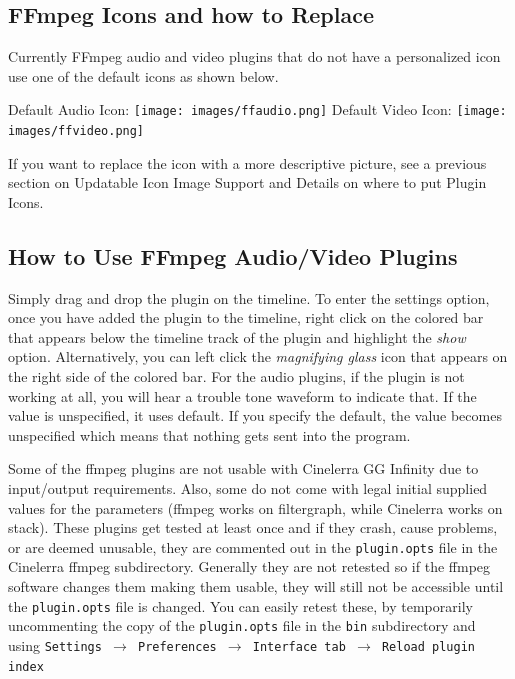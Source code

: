 \subsection{FFmpeg Icons and how to Replace}%
\label{sub:ffmpeg_icons_how_replace}

Currently FFmpeg audio and video plugins that do not have a personalized icon use one of the default icons as shown below.

Default Audio Icon: \quad \texttt{[image: images/ffaudio.png]}
\quad Default Video Icon: \quad \texttt{[image: images/ffvideo.png]}

If you want to replace the icon with a more descriptive picture, see a previous section on Updatable Icon Image Support and Details on where to put Plugin Icons.

\subsection{How to Use FFmpeg Audio/Video Plugins}%
\label{sub:use_ffmpeg_audio_video_plugins}

Simply drag and drop the plugin on the timeline. To enter the settings option, once you have added the plugin to the timeline, right click on the colored bar that appears below the timeline track of the plugin and highlight the \textit{show} option. Alternatively, you can left click the \textit{magnifying glass} icon that appears on the right side of the colored bar. For the audio plugins, if the plugin is not working at all, you will hear a trouble tone waveform to indicate that. If the value is unspecified, it uses default. If you specify the default, the value becomes unspecified which means that nothing gets sent into the program.

Some of the ffmpeg plugins are not usable with Cinelerra GG Infinity due to input/output requirements. Also, some do not come with legal initial supplied values for the parameters (ffmpeg works on filtergraph, while Cinelerra works on stack). These plugins get tested at least once and if they crash, cause problems, or are deemed unusable, they are commented out in the \texttt{plugin.opts} file in the Cinelerra ffmpeg subdirectory. Generally they are not retested so if the ffmpeg software changes them making them usable, they will still not be accessible until the \texttt{plugin.opts} file is changed. You can easily retest these, by temporarily uncommenting the copy of the \texttt{plugin.opts} file in the \texttt{bin} subdirectory and using \texttt{Settings $\rightarrow$ Preferences $\rightarrow$ Interface tab $\rightarrow$ Reload plugin index}

